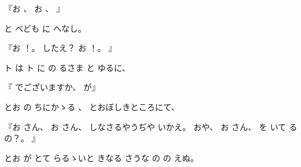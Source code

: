 %
『お
、
%
お
、
』

%
と
べども
に
へなし。

%
『お
！。
%
したえ？
お
！。
』

%
ト
は
ト
に
の
るさま
と
ゆるに、

%
『
でございますか、
%
が』

%
とお
の
ちにかゝる
、
%
とおぼしきところにて、

%
『お
さん、
%
お
さん、
%
しなさるやうぢや
いかえ。
%
おや、
%
お
さん、
%
を
いて
るの？。
』

%
とお
が
とて
らるゝいと
きなる
さうな
の
の
えぬ。
